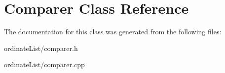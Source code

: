 \hypertarget{class_comparer}{\section{Comparer Class Reference}
\label{class_comparer}
}


The documentation for this class was generated from the following files\-:\begin{DoxyCompactItemize}
\item 
ordinate\-List/comparer.\-h\item 
ordinate\-List/comparer.\-cpp\end{DoxyCompactItemize}

